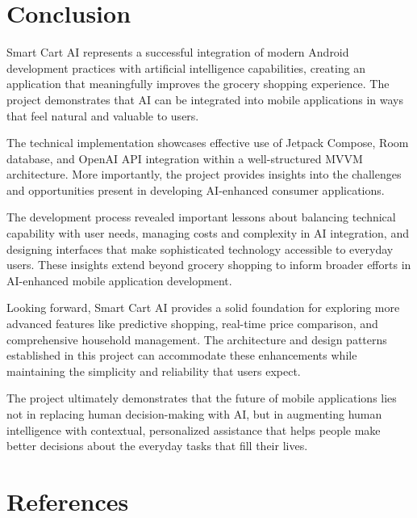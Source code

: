 \documentclass[11pt,a4paper]{article}
\begin{document}
\section{Conclusion}

Smart Cart AI represents a successful integration of modern Android development practices with artificial intelligence capabilities, creating an application that meaningfully improves the grocery shopping experience. The project demonstrates that AI can be integrated into mobile applications in ways that feel natural and valuable to users.

The technical implementation showcases effective use of Jetpack Compose, Room database, and OpenAI API integration within a well-structured MVVM architecture. More importantly, the project provides insights into the challenges and opportunities present in developing AI-enhanced consumer applications.

The development process revealed important lessons about balancing technical capability with user needs, managing costs and complexity in AI integration, and designing interfaces that make sophisticated technology accessible to everyday users. These insights extend beyond grocery shopping to inform broader efforts in AI-enhanced mobile application development.

Looking forward, Smart Cart AI provides a solid foundation for exploring more advanced features like predictive shopping, real-time price comparison, and comprehensive household management. The architecture and design patterns established in this project can accommodate these enhancements while maintaining the simplicity and reliability that users expect.

The project ultimately demonstrates that the future of mobile applications lies not in replacing human decision-making with AI, but in augmenting human intelligence with contextual, personalized assistance that helps people make better decisions about the everyday tasks that fill their lives.

\newpage

\section*{References}
\end{document}
